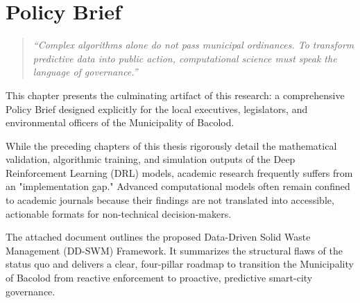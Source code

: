 \chapter{Policy Brief}

\begin{quote}
\textit{“Complex algorithms alone do not pass municipal ordinances. To transform predictive data into public action, computational science must speak the language of governance.”}
\end{quote}


This chapter presents the culminating artifact of this research: a comprehensive Policy Brief designed explicitly for the local executives, legislators, and environmental officers of the Municipality of Bacolod. 

While the preceding chapters of this thesis rigorously detail the mathematical validation, algorithmic training, and simulation outputs of the Deep Reinforcement Learning (DRL) models, academic research frequently suffers from an "implementation gap." Advanced computational models often remain confined to academic journals because their findings are not translated into accessible, actionable formats for non-technical decision-makers. 

The attached document outlines the proposed Data-Driven Solid Waste Management (DD-SWM) Framework. It summarizes the structural flaws of the status quo and delivers a clear, four-pillar roadmap to transition the Municipality of Bacolod from reactive enforcement to proactive, predictive smart-city governance.



